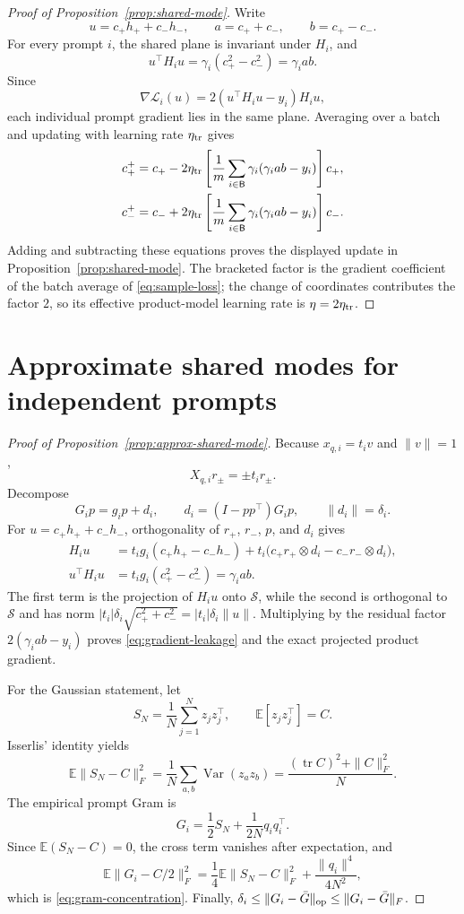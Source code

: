 \documentclass[11pt]{article}
\newcommand{\E}{\mathbb E}
\begin{document}
\begin{proof}[Proof of Proposition~\ref{prop:shared-mode}]
Write
\[
u=c_+h_++c_-h_-,
\qquad
a=c_++c_-,
\qquad
b=c_+-c_-.
\]
For every prompt \(i\), the shared plane is invariant under \(H_i\), and
\[
u^\top H_i u
=\gamma_i(c_+^2-c_-^2)
=\gamma_iab.
\]
Since
\[
\nabla\mathcal L_i(u)
=2(u^\top H_i u-y_i)H_i u,
\]
each individual prompt gradient lies in the same plane.  Averaging over a
batch and updating with learning rate \(\eta_{\rm tr}\) gives
\begin{align*}
c_+^+
&=c_+-2\eta_{\rm tr}
\left[\frac1m\sum_{i\in\mathsf B}
\gamma_i(\gamma_iab-y_i)\right]c_+,\\
c_-^+
&=c_-+2\eta_{\rm tr}
\left[\frac1m\sum_{i\in\mathsf B}
\gamma_i(\gamma_iab-y_i)\right]c_-.
\end{align*}
Adding and subtracting these equations proves the displayed update in
Proposition~\ref{prop:shared-mode}.  The bracketed factor is the gradient
coefficient of the batch average of \eqref{eq:sample-loss}; the change of
coordinates contributes the factor \(2\), so its effective product-model
learning rate is \(\eta=2\eta_{\rm tr}\).
\end{proof}

\section{Approximate shared modes for independent prompts}
\label{app:approx-mode-proof}

\begin{proof}[Proof of Proposition~\ref{prop:approx-shared-mode}]
Because \(x_{q,i}=t_i v\) and \(\|v\|=1\),
\[
X_{q,i}r_\pm=\pm t_i r_\pm.
\]
Decompose
\[
G_i p=g_i p+d_i,\qquad
d_i=(I-pp^\top)G_i p,\qquad \|d_i\|=\delta_i.
\]
For \(u=c_+h_++c_-h_-\), orthogonality of \(r_+\), \(r_-\), \(p\), and
\(d_i\) gives
\begin{align*}
H_i u
&=
t_i g_i(c_+h_+-c_-h_-)
+t_i\bigl(c_+r_+\otimes d_i-c_-r_-\otimes d_i\bigr),\\
u^\top H_i u
&=t_i g_i(c_+^2-c_-^2)
=\gamma_iab.
\end{align*}
The first term is the projection of \(H_i u\) onto \(\mathcal S\), while
the second is orthogonal to \(\mathcal S\) and has norm
\(|t_i|\delta_i\sqrt{c_+^2+c_-^2}=|t_i|\delta_i\|u\|\).  Multiplying by
the residual factor \(2(\gamma_iab-y_i)\) proves
\eqref{eq:gradient-leakage} and the exact projected product gradient.

For the Gaussian statement, let
\[
S_N=\frac1N\sum_{j=1}^N z_jz_j^\top,\qquad
\E[z_jz_j^\top]=C.
\]
Isserlis' identity yields
\[
\E\|S_N-C\|_F^2
=\frac1N\sum_{a,b}\operatorname{Var}(z_a z_b)
=\frac{(\operatorname{tr}C)^2+\|C\|_F^2}{N}.
\]
The empirical prompt Gram is
\[
G_i=\frac12S_N+\frac1{2N}q_iq_i^\top.
\]
Since \(\E(S_N-C)=0\), the cross term vanishes after expectation, and
\[
\E\|G_i-C/2\|_F^2
=\frac14\E\|S_N-C\|_F^2+\frac{\|q_i\|^4}{4N^2},
\]
which is \eqref{eq:gram-concentration}.  Finally,
\(\delta_i\le\|G_i-\bar G\|_{\rm op}\le\|G_i-\bar G\|_F\).
\end{proof}
\end{document}
